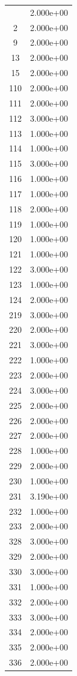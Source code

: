 \documentclass[12pt]{article}
\begin{document}
\begin{longtable}{@{}cc@{}}
\bottomrule
\endlastfoot
1 & 2.000e+00 \\
2 & 2.000e+00 \\
9 & 2.000e+00 \\
13 & 2.000e+00 \\
15 & 2.000e+00 \\
110 & 2.000e+00 \\
111 & 2.000e+00 \\
112 & 3.000e+00 \\
113 & 1.000e+00 \\
114 & 1.000e+00 \\
115 & 3.000e+00 \\
116 & 1.000e+00 \\
117 & 1.000e+00 \\
118 & 2.000e+00 \\
119 & 1.000e+00 \\
120 & 1.000e+00 \\
121 & 1.000e+00 \\
122 & 3.000e+00 \\
123 & 1.000e+00 \\
124 & 2.000e+00 \\
219 & 3.000e+00 \\
220 & 2.000e+00 \\
221 & 3.000e+00 \\
222 & 1.000e+00 \\
223 & 2.000e+00 \\
224 & 3.000e+00 \\
225 & 2.000e+00 \\
226 & 2.000e+00 \\
227 & 2.000e+00 \\
228 & 1.000e+00 \\
229 & 2.000e+00 \\
230 & 1.000e+00 \\
231 & 3.190e+00 \\
232 & 1.000e+00 \\
233 & 2.000e+00 \\
328 & 3.000e+00 \\
329 & 2.000e+00 \\
330 & 3.000e+00 \\
331 & 1.000e+00 \\
332 & 2.000e+00 \\
333 & 3.000e+00 \\
334 & 2.000e+00 \\
335 & 2.000e+00 \\
336 & 2.000e+00 \\

\end{longtable}
\end{document}
